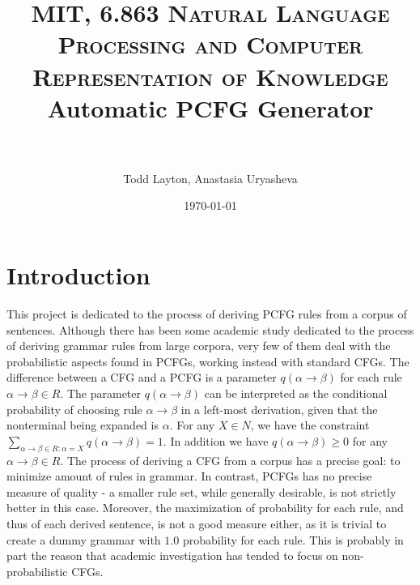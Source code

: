 \documentclass[paper=a4, fontsize=11pt]{scrartcl} %
\title{	
\normalfont \normalsize 
\textsc{MIT, 6.863 Natural Language Processing and Computer Representation of Knowledge}
\horrule{0.5pt} \\[0.4cm] %
\huge Automatic PCFG Generator \\ %
\horrule{2pt} \\[0.5cm] %
}
\author {Todd Layton, Anastasia Uryasheva}
\date{\normalsize\today}
\numberwithin{equation}{section} %
\numberwithin{figure}{section} %
\numberwithin{table}{section} %
\begin{document}
\maketitle %


\section{Introduction}

This project is dedicated to the process of deriving PCFG rules from a corpus of sentences. Although there has been some academic study dedicated to the process of deriving grammar rules from large corpora, very few of them deal with the probabilistic aspects found in PCFGs, working instead with standard CFGs. The difference between a CFG and a PCFG is a parameter \begin{math} q(\alpha \rightarrow \beta) \end{math} for each rule \begin{math} \alpha\rightarrow \beta \in R \end{math}. The parameter \begin{math} q(\alpha \rightarrow \beta) \end{math} can be interpreted as the conditional probability of choosing rule \begin{math} \alpha \rightarrow \beta \end{math} in a left-most derivation, given that the nonterminal being expanded is \begin{math} \alpha \end{math}. For any \begin{math} X \in N \end{math}, we have the constraint \begin{math} \sum_{\alpha\rightarrow\beta\in R:\alpha=X} q(\alpha\rightarrow\beta) = 1 \end{math}. In addition we have \begin{math} q(\alpha\rightarrow\beta) \geqslant 0 \end{math} for any \begin{math} \alpha \rightarrow \beta \in R \end{math}. 
The process of deriving a CFG from a corpus has a precise goal: to minimize amount of rules in grammar. In contrast, PCFGs has no precise measure of quality - a smaller rule set, while generally desirable, is not strictly better in this case. Moreover, the maximization of probability for each rule, and thus of each derived sentence, is not a good measure either,  as it is trivial to create a dummy grammar with $1.0$ probability for each rule. This is probably in part the reason that academic investigation has tended to focus on  non-probabilistic CFGs.
\end{document}

